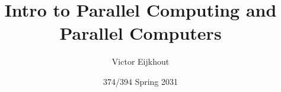 \documentclass[headnav]{beamer}
\begin{document}
\title{Intro to Parallel Computing and Parallel Computers}
\author{Victor Eijkhout}
\date{374/394 Spring 2031}
\frame{\titlepage}
\end{document}

